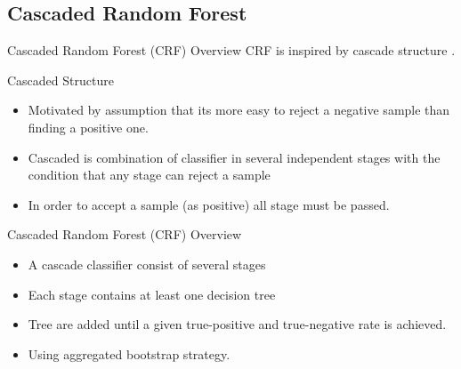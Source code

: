 \documentclass[english]{beamer}
\begin{document}
\subsection{Cascaded Random Forest}

\begin{frame}{Cascaded Random Forest (CRF)}
	{Overview}
	CRF is inspired by cascade structure \cite{viola2004robust}.

	\begin{block}{Cascaded Structure}
		\begin{itemize}
		\item Motivated by assumption that its more easy to reject a negative
		sample than finding a positive one.
		\item Cascaded is combination of classifier in several independent
		stages with the condition that any stage can reject a sample
		\item In order to accept a sample (as positive) all stage must be
		passed.
		\end{itemize}
	\end{block}
\end{frame}

\begin{frame}
	{Cascaded Random Forest (CRF)}
	{Overview}
	\begin{itemize}
		\item A cascade classifier consist of several stages
		\item Each stage contains at least one decision tree
		\item Tree are added until a given true-positive and true-negative rate
		is achieved.
		\item Using aggregated bootstrap strategy.
	\end{itemize}
\end{frame}
\end{document}
